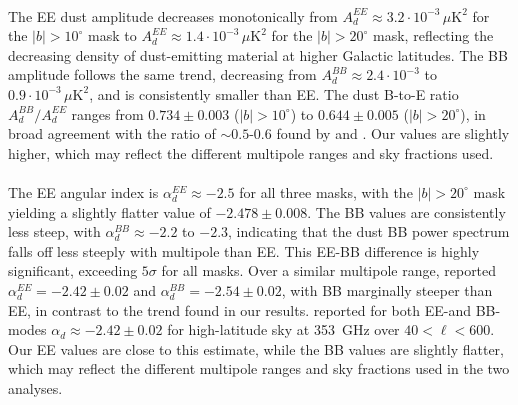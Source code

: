 \paragraph{}

The EE dust amplitude decreases monotonically from $A_d^{EE} \approx 3.2 \cdot 10^{-3}\,\mu\mathrm{K}^2$ for the $|b| > 10^\circ$ mask to $A_d^{EE} \approx 1.4 \cdot 10^{-3}\,\mu\mathrm{K}^2$ for the $|b| > 20^\circ$ mask, reflecting the decreasing density of dust-emitting material at higher Galactic latitudes. The BB amplitude follows the same trend, decreasing from $A_d^{BB} \approx 2.4 \cdot 10^{-3}$ to $0.9 \cdot 10^{-3}\, \mu\mathrm{K}^2$, and is consistently smaller than EE. The dust B-to-E ratio $A_d^{BB}/A_d^{EE}$ ranges from $0.734 \pm 0.003$ ($|b| > 10^\circ$) to $0.644 \pm 0.005$ ($|b| > 20^\circ$), in broad agreement with the ratio of $\sim 0.5$-$0.6$ found by \citet{Planck_2018XI} and \citet{Planck_2016XXX}. Our values are slightly higher, which may reflect the different multipole ranges and sky fractions used. 

\paragraph{}

The EE angular index is $\alpha_d^{EE} \approx -2.5$ for all three masks, with the $|b| > 20^\circ$ mask yielding a slightly flatter value of $-2.478 \pm 0.008$. The BB values are consistently less steep, with $\alpha_d^{BB} \approx -2.2$ to $-2.3$, indicating that the dust BB power spectrum falls off less steeply with multipole than EE. This EE-BB difference is highly significant, exceeding $5\sigma$ for all masks. Over a similar multipole range, \citet{Planck_2018XI} reported $\alpha_d^{EE} = -2.42 \pm 0.02$ and $\alpha_d^{BB} = -2.54 \pm 0.02$, with BB marginally steeper than EE, in contrast to the trend found in our results. \citet{Planck_2016XXX} reported for both EE-and BB-modes $\alpha_d \approx -2.42 \pm 0.02$ for high-latitude sky at 353~GHz over $40 < \ell < 600$. Our EE values are close to this estimate, while the BB values are slightly flatter, which may reflect the different multipole ranges and sky fractions used in the two analyses.

\paragraph{}

